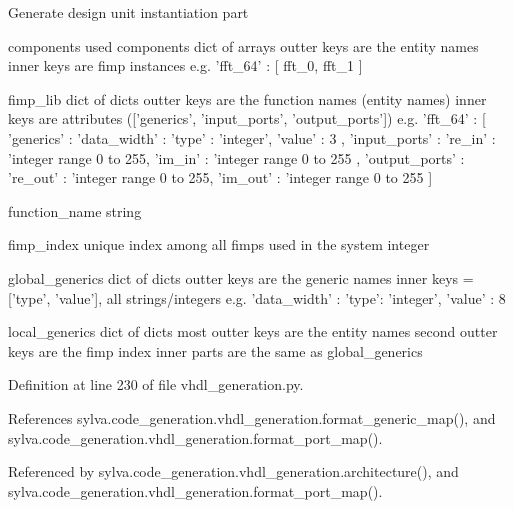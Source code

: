\begin{DoxyVerb}Generate design unit instantiation part

  components
    used components
    dict of arrays
    outter keys are the entity names
    inner keys are fimp instances
    e.g. { 'fft_64' : [ fft_0, fft_1 ] }

  fimp_lib
    dict of dicts
    outter keys are the function names (entity names)
    inner keys are attributes (['generics', 'input_ports', 'output_ports'])
    e.g. { 'fft_64' :
           [ 'generics' :
             { 'data_width' :
               { 'type' : 'integer', 'value' : 3 }
             },
             'input_ports' :
             { 're_in' : 'integer range 0 to 255,
               'im_in' : 'integer range 0 to 255
             },
             'output_ports' :
             { 're_out' : 'integer range 0 to 255,
               'im_out' : 'integer range 0 to 255
             }
           ]
         }

  function_name
    string

  fimp_index
    unique index among all fimps used in the system
    integer

  global_generics
    dict of dicts
    outter keys are the generic names
    inner keys = ['type', 'value'], all strings/integers
    e.g. { 'data_width' : { 'type': 'integer', 'value' : 8 } }

  local_generics
    dict of dicts
    most outter keys are the entity names
    second outter keys are the fimp index
    inner parts are the same as global_generics
\end{DoxyVerb}
 

Definition at line 230 of file vhdl\+\_\+generation.\+py.



References sylva.\+code\+\_\+generation.\+vhdl\+\_\+generation.\+format\+\_\+generic\+\_\+map(), and sylva.\+code\+\_\+generation.\+vhdl\+\_\+generation.\+format\+\_\+port\+\_\+map().



Referenced by sylva.\+code\+\_\+generation.\+vhdl\+\_\+generation.\+architecture(), and sylva.\+code\+\_\+generation.\+vhdl\+\_\+generation.\+format\+\_\+port\+\_\+map().


